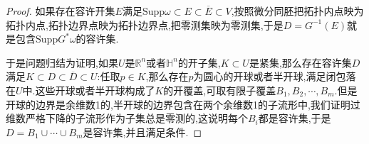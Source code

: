 \begin{enumerate}
\begin{proof}
    	如果存在容许开集$E$满足$\mathrm{Supp}\omega\subset E\subset\overline{E}\subset V$,按照微分同胚把拓扑内点映为拓扑内点,拓扑边界点映为拓扑边界点,把零测集映为零测集,于是$D=G^{-1}(E)$就是包含$\mathrm{Supp}G^*\omega$的容许集.
    	
    	于是问题归结为证明,如果$U$是$\mathbb{R}^n$或者$\mathbb{H}^n$的开子集,$K\subset U$是紧集,那么存在容许集$D$满足$K\subset D\subset\overline{D}\subset U$:任取$p\in K$,那么存在$p$为圆心的开球或者半开球,满足闭包落在$U$中.这些开球或者半开球构成了$K$的开覆盖,可取有限子覆盖$B_1,B_2,\cdots,B_m$.但是开球的边界是余维数1的,半开球的边界包含在两个余维数1的子流形中,我们证明过维数严格下降的子流形作为子集总是零测的,这说明每个$B_i$都是容许集,于是$D=B_1\cup\cdots\cup B_m$是容许集,并且满足条件.
    \end{proof}
\end{enumerate}

